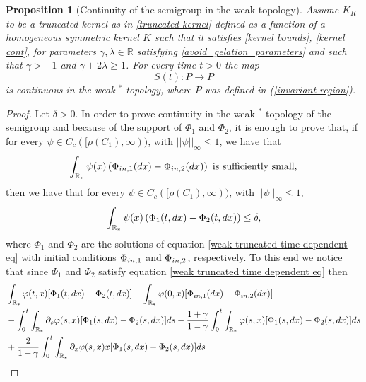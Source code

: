 \documentclass[11pt]{article}
\numberwithin{equation}{section}
\theoremstyle{plain}
\newtheorem{proposition}[theorem]{Proposition}
\newcommand{\der}{\textup{d}}
\begin{document}
\begin{proposition}[Continuity of the semigroup in the weak topology] \label{prop:weak star cont} 
Assume $K_R$ to be a truncated kernel as in \eqref{truncated kernel} defined as a function of a homogeneous symmetric kernel $K$ such that it satisfies \eqref{kernel bounds},  \eqref{kernel cont},  for parameters $\gamma , \lambda \in \mathbb R $ satisfying \eqref{avoid_gelation_parameters} and such that $\gamma > -1$ and $\gamma + 2 \lambda \geq 1 $. 
For every time $t>0$ the map 
\[
 S(t):P\rightarrow P
\] 
is continuous in the weak-$^{\ast}$ topology, where $P$ was defined in (\ref{invariant region}).
\end{proposition}
\begin{proof}
Let $\delta>0$. In order to prove continuity in the weak-$^{\ast}$ topology of the semigroup and because of the support of $\Phi_{1}$ and $\Phi_{2}$, it is enough to prove that, if  for every $\psi \in C_c([\rho(C_{1}),\infty))$, with $||\psi||_{\infty}\leq 1$, we have that 
\begin{align}\label{sufficiently small}
    \int_{\mathbb R_*} \psi (x) \left( \Phi_{\textup{in}, 1 } (\der x) - \Phi_{\textup{in}, 2} ( \der x ) \right) \text{ is sufficiently small,}
\end{align}
 then we have that for every $\psi \in C_c([\rho(C_{1}),\infty))$, with $||\psi||_{\infty}\leq 1,$
\begin{align*}
\int_{\mathbb R_*} \psi (x) \left( \Phi_1 (t, \der x) - \Phi_2(t, \der x ) \right) \leq \delta,
\end{align*}
where $\Phi_1 $ and $\Phi_2 $ are the solutions of equation \eqref{weak truncated time dependent eq} with initial conditions $\Phi_{\textup{in}, 1} $ and $\Phi_{\textup{in}, 2} $, respectively. 
To this end we notice that since $\Phi_1$ and $\Phi_2 $ satisfy equation \eqref{weak truncated time dependent eq} then 
\begin{align*}
&\int_{\mathbb R_*} \varphi(t,x) [{\Phi_{1}}(t, \der x)-{\Phi_{2}}(t, \der x)]-\int_{\mathbb R_*} \varphi(0,x) [{\Phi_{\textup{in},1}}( \der x)-{\Phi_{\textup{in},2}}( \der x)] \\
& -\int_{0}^{t}\int_{\mathbb R_*} \partial_{s}\varphi(s,x) [{\Phi_{1}}(s, \der x)-{\Phi_{2}}(s, \der x)]\der s
- \frac{1+\gamma}{1-\gamma} \int_{0}^{t}\int_{\mathbb R_*}  \varphi(s,x) [{\Phi_{1}}(s, \der x)-{\Phi_{2}}(s, \der x)]\der s \\ & +\frac{2}{1-\gamma}\int_{0}^{t} \int_{\mathbb R_*}  \partial_x \varphi(s,x) x [{\Phi_{1}}(s, \der x)-{\Phi_{2}}(s, \der x)]\der s \\

\end{align*}
\end{proof}
\end{document}
